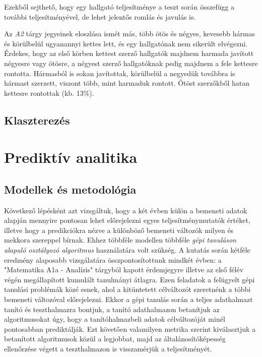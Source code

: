 \documentclass[12pt]{article}
\begin{document}
Ezekből sejthető, hogy egy hallgató teljesítménye a teszt során összefügg a további teljesítményével, de lehet jelentős romlás és javulás is.

Az \textit{A2} tárgy jegyeinek eloszlása ismét más, több ötös és négyes, kevesebb hármas és körülbelül ugyanannyi kettes lett, és egy hallgatónak nem sikerült elvégezni. Érdekes, hogy az első körben kettest szerző hallgatók majdnem harmada javított négyesre vagy ötösre, a négyest szerző hallgatóknak pedig majdnem a fele kettesre rontotta. Hármasból is sokan javítottak, körülbelül a negyedük továbbra is hármast szerzett, viszont több, mint harmaduk rontott. Ötöst szerzőkből hatan kettesre rontottak (kb. 13\%).

















\subsection{Klaszterezés}


\section{Prediktív analitika}

\subsection{Modellek és metodológia}

Következő lépésként azt vizsgáltuk, hogy a két évben külön a bemeneti adatok alapján mennyire pontosan lehet előrejelezni egyes teljesítménymutatók értéket, illetve hogy a predikciókra nézve a különböző bemeneti változók milyen és mekkora szereppel bírnak. Ehhez többféle modellen többféle \textit{gépi tanuláson alapuló osztályozó algoritmus} használatára volt szükség. A kutatás során kétféle eredmény alaposabb vizsgálatára összpontosítottunk mindkét évben: a "Matematika A1a - Analízis" tárgyból kapott érdemjegyre illetve az első félév végén megállapított kumulált tanulmányi átlagra. Ezen feladatok a felügyelt gépi tanulási problémák közé esnek, ahol a kitüntetett célváltozót szeretnénk a többi bemeneti változóval előrejelezni. Ekkor a gépi tanulás során a teljes adathalmazt tanító és teszthalmazra bontjuk, a tanító adathalmazon betanítjuk az algoritmusokat úgy, hogy a tanítóhalmazbeli adatok célváltozóját minél pontosabban prediktálják. Ezt követően valamilyen metrika szerint kiválasztjuk a betanított algoritmusok közül a legjobbat, majd az általánosítóképesség ellenőrzése végett a teszthalmazon is visszamérjük a teljesítményét.
\end{document}
